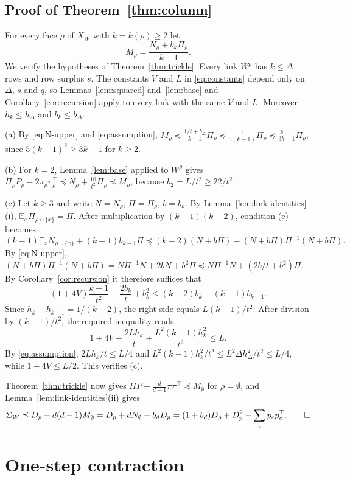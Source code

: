 \documentclass{amsart}
\numberwithin{equation}{section}
\theoremstyle{plain}
\theoremstyle{definition}
\theoremstyle{remark}
\newcommand{\E}{\mathbb{E}}
\newcommand{\T}{\top}
\begin{document}
\subsection{Proof of Theorem~\ref{thm:column}}
For every face $\rho$ of $X_W$ with $k=k(\rho)\ge2$ let
\[
M_\rho=\frac{N_\rho+b_k\Pi_\rho}{k-1}.
\]
We verify the hypotheses of Theorem~\ref{thm:trickle}. Every link $W^\rho$ has $k\le\Delta$ rows and row surplus $s$. The constants $V$ and $L$ in \eqref{eq:constants} depend only on $\Delta$, $s$ and $q$, so Lemmas~\ref{lem:squared} and~\ref{lem:base} and Corollary~\ref{cor:recursion} apply to every link with the same $V$ and $L$. Moreover $h_k\le h_\Delta$ and $b_k\le b_\Delta$.

(a) By \eqref{eq:N-upper} and \eqref{eq:assumption}, $M_\rho\preceq\frac{1/t+b_\Delta}{k-1}\Pi_\rho\preceq\frac{1}{5(k-1)}\Pi_\rho\preceq\frac{k-1}{3k-1}\Pi_\rho$, since $5(k-1)^2\ge3k-1$ for $k\ge2$.

(b) For $k=2$, Lemma~\ref{lem:base} applied to $W^\rho$ gives $\Pi_\rho P_\rho-2\pi_\rho\pi_\rho^\T\preceq N_\rho+\frac{10}{t^2}\Pi_\rho\preceq M_\rho$, because $b_2=L/t^2\ge22/t^2$.

(c) Let $k\ge3$ and write $N=N_\rho$, $\Pi=\Pi_\rho$, $b=b_k$. By Lemma~\ref{lem:link-identities}(i), $\E_x\Pi_{\rho\cup\{x\}}=\Pi$. After multiplication by $(k-1)(k-2)$, condition (c) becomes
\[
(k-1)\E_xN_{\rho\cup\{x\}}+(k-1)b_{k-1}\Pi\preceq(k-2)(N+b\Pi)-(N+b\Pi)\Pi^{-1}(N+b\Pi).
\]
By \eqref{eq:N-upper}, $(N+b\Pi)\Pi^{-1}(N+b\Pi)=N\Pi^{-1}N+2bN+b^2\Pi\preceq N\Pi^{-1}N+(2b/t+b^2)\Pi$. By Corollary~\ref{cor:recursion} it therefore suffices that
\[
(1+4V)\frac{k-1}{t^2}+\frac{2b_k}{t}+b_k^2\le(k-2)b_k-(k-1)b_{k-1}.
\]
Since $h_k-h_{k-1}=1/(k-2)$, the right side equals $L(k-1)/t^2$. After division by $(k-1)/t^2$, the required inequality reads
\[
1+4V+\frac{2Lh_k}{t}+\frac{L^2(k-1)h_k^2}{t^2}\le L .
\]
By \eqref{eq:assumption}, $2Lh_k/t\le L/4$ and $L^2(k-1)h_k^2/t^2\le L^2\Delta h_\Delta^2/t^2\le L/4$, while $1+4V\le L/2$. This verifies (c).

Theorem~\ref{thm:trickle} now gives $\Pi P-\frac{d}{d-1}\pi\pi^\T\preceq M_\emptyset$ for $\rho=\emptyset$, and Lemma~\ref{lem:link-identities}(ii) gives
\[
\Sigma_W\preceq D_p+d(d-1)M_\emptyset=D_p+dN_\emptyset+b_dD_p=(1+b_d)D_p+D_p^2-\sum_cp_cp_c^\T .\qed
\]

\section{One-step contraction}\label{sec:contraction}
\end{document}
